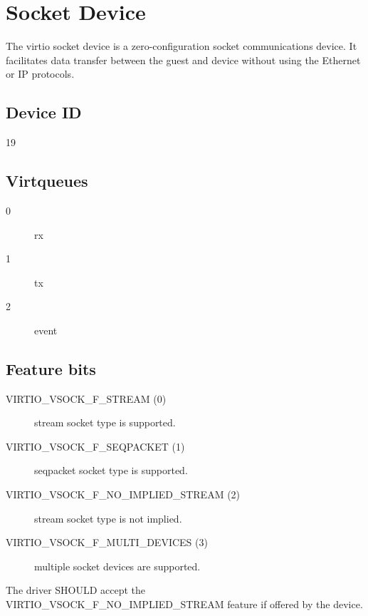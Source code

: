 \section{Socket Device}\label{sec:Device Types / Socket Device}

The virtio socket device is a zero-configuration socket communications device.
It facilitates data transfer between the guest and device without using the
Ethernet or IP protocols.

\subsection{Device ID}\label{sec:Device Types / Socket Device / Device ID}
  19

\subsection{Virtqueues}\label{sec:Device Types / Socket Device / Virtqueues}
\begin{description}
\item[0] rx
\item[1] tx
\item[2] event
\end{description}

\subsection{Feature bits}\label{sec:Device Types / Socket Device / Feature bits}

\begin{description}
\item[VIRTIO_VSOCK_F_STREAM (0)] stream socket type is supported.
\item[VIRTIO_VSOCK_F_SEQPACKET (1)] seqpacket socket type is supported.
\item[VIRTIO_VSOCK_F_NO_IMPLIED_STREAM (2)] stream socket type is not implied.
\item[VIRTIO_VSOCK_F_MULTI_DEVICES (3)] multiple socket devices are supported.
\end{description}


The driver SHOULD accept the VIRTIO_VSOCK_F_NO_IMPLIED_STREAM feature if
offered by the device.

